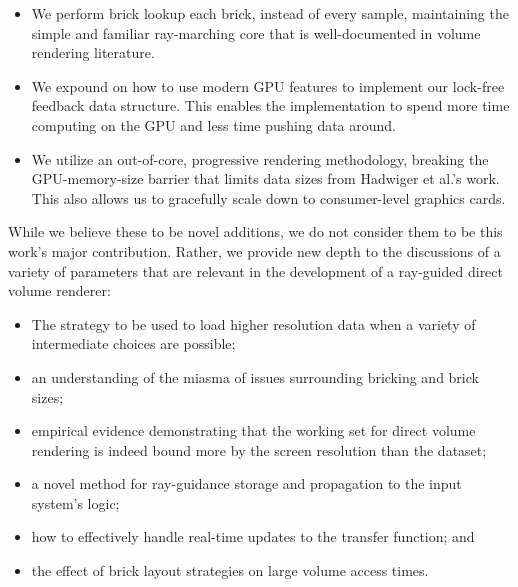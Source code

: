 \begin{itemize}
  \itemsep0em
  \item We perform brick lookup each brick, instead of every sample,
  maintaining the simple and familiar ray-marching core that is
  well-documented in volume rendering literature.

  \item We expound on how to use modern GPU features to implement our
  lock-free feedback data structure.  This enables the implementation
  to spend more time computing on the GPU and less time pushing data
  around.

  \item We utilize an out-of-core, progressive rendering methodology,
  breaking the GPU-memory-size barrier that limits data sizes from
  Hadwiger et al.'s work.  This also allows us to gracefully scale down
  to consumer-level graphics cards.
\end{itemize}

While we believe these to be novel additions, we do not consider them
to be this work's major contribution.  Rather, we provide new depth to
the discussions of a variety of parameters that are relevant in the
development of a ray-guided direct volume renderer:

\begin{itemize}
  \itemsep0em
  \item The strategy to be used to load higher resolution data when a
  variety of intermediate choices are possible;

  \item an understanding of the miasma of issues surrounding bricking
  and brick sizes;

  \item empirical evidence demonstrating that the working set for
  direct volume rendering is indeed bound more by the screen resolution
  than the dataset;

  \item a novel method for ray-guidance storage and propagation to the
  input system's logic;

  \item how to effectively handle real-time updates to the transfer
  function; and

  \item the effect of brick layout strategies on large volume access
  times.

\end{itemize}


